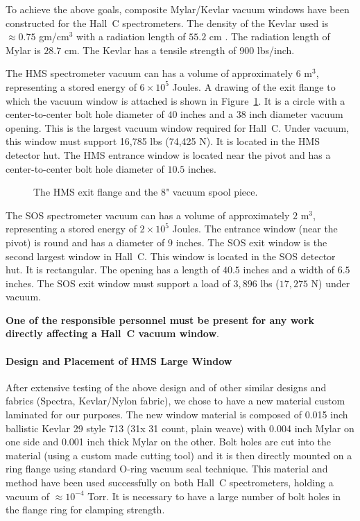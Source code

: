 To achieve the above goals,
composite Mylar/Kevlar vacuum windows have been constructed for the
Hall~C spectrometers. The density of the Kevlar used
is $\approx 0.75$ gm/cm$^3$ with a radiation
length of $55.2$ cm \cite{rdup1}. The radiation length
of Mylar is $28.7$ cm. The Kevlar has a tensile strength of 900 lbs/inch.

The HMS spectrometer vacuum can has a volume
of approximately $6$ m$^3$, representing a stored energy of $6 \times 10^5$
Joules. A drawing of the exit flange to which the vacuum
window is attached is shown in Figure~\ref{fig:hms_flange}.  It is a
circle with a center-to-center bolt hole diameter of $40$ inches
and a $38$ inch diameter vacuum opening. This is the largest vacuum window
required for Hall~C.
Under vacuum, this window must support 16,785
lbs (74,425 N). It is located in the HMS detector hut. The HMS
entrance window is located near the pivot and has a center-to-center
bolt hole diameter of $10.5$ inches.

\begin{figure}
\caption{The HMS exit flange and the 8" vacuum spool piece. \label{fig:hms_flange}}
\end{figure}

The SOS spectrometer vacuum can has a volume of approximately $2$ m$^3$,
representing a stored energy of $2 \times 10^5$ Joules. The entrance
window (near the pivot) is round and has a diameter of $9$ inches.
The SOS exit window is the second largest window in Hall~C. This
window is located in the SOS detector hut. It is rectangular.
The opening has a length of $40.5$ inches and a width of $6.5$ inches.
The SOS exit
window must support a load of $3,896$ lbs ($17,275$ N) under vacuum.

{\bf One of the responsible personnel must be present for
any work directly affecting a Hall~C vacuum window}.

\paragraph{Design and Placement of HMS Large Window}

After extensive testing of the above design
and of other similar designs and fabrics (Spectra, Kevlar/Nylon fabric),
we chose to have a new
material custom laminated for our purposes. The new window material is
composed of 0.015 inch ballistic Kevlar 29 style 713 (31x 31 count,
plain weave)
with 0.004 inch Mylar on
one side
and 0.001 inch thick Mylar on the other. Bolt holes are cut into the material
(using a custom made cutting tool) and it is then directly
mounted on a ring flange using standard O-ring vacuum
seal technique.  This material and
method have
been used successfully on both Hall~C spectrometers, holding a vacuum of
$\approx 10^{-4}$ Torr. It is necessary to have a large number of bolt holes in the flange ring
for clamping strength.

